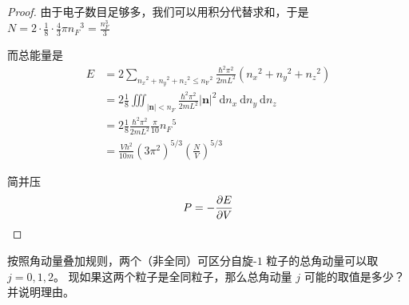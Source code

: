 \begin{proof}
由于电子数目足够多，我们可以用积分代替求和，于是 $N=2 \cdot \frac{1}{8} \cdot \frac{4}{3} \pi n_{F}{ }^{3}=\frac{n_{F}^{3}}{3}$

而总能量是
$$\begin{aligned}
E & =2 \sum_{n_{x}{ }^{2}+n_{y}{ }^{2}+n_{z}{ }^{2} \leq n_{\mathrm{F}}{ }^{2}} \frac{\hbar^{2} \pi^{2}}{2mL^{2}}\left(n_{x}{ }^{2}+n_{y}{ }^{2}+n_{z}{ }^{2}\right) \\
& =2 \frac{1}{8} \iiint_{|\mathbf{n}|<n_{F}} \frac{\hbar^{2} \pi^{2}}{2 m L^{2}}|\mathbf{n}|^{2} \mathrm{~d} n_{x} \mathrm{~d} n_{y} \mathrm{~d} n_{z} \\
& =2 \frac{1}{8} \frac{\hbar^{2} \pi^{2}}{2 m L^{2}} \frac{\pi}{10} n_{F}{ }^{5} \\
& =\frac{V h^{2}}{10m}\left(3 \pi^{2}\right)^{5 / 3}\left(\frac{N}{V}\right)^{5 / 3}
\end{aligned}$$

简并压
$$P=-\frac{\partial E}{\partial V}\qedhere$$
\end{proof}
\begin{4}
    按照角动量叠加规则，两个（非全同）可区分自旋-$1$ 粒子的总角动量可以取 $j=0,1,2$。
    现如果这两个粒子是全同粒子，那么总角动量 $j$ 可能的取值是多少？并说明理由。
\end{4}
